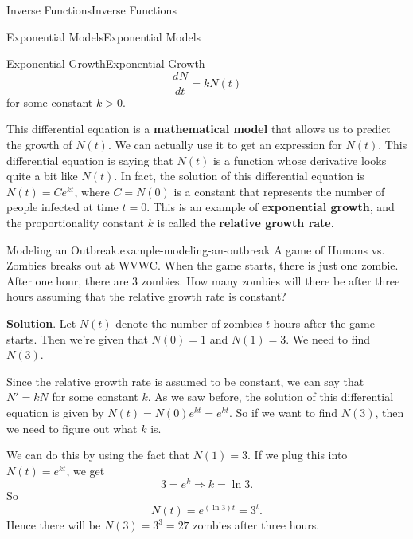 \documentclass[10pt,]{book}
\newcommand{\terminology}[1]{\textbf{#1}}
\numberwithin{equation}{section}
\newcommand{\dv}[3][]{\dfrac{d^{#1} #2}{d #3^{#1}}}
\begin{document}
\begin{chapterptx}{Inverse Functions}{}{Inverse Functions}{}{}
\begin{sectionptx}{Exponential Models}{}{Exponential Models}{}{}
\begin{subsectionptx}{Exponential Growth}{}{Exponential Growth}{}{}
\begin{equation*}
\dv{N}{t} = kN(t)
\end{equation*}
for some constant \(k > 0\).%
\par
\hypertarget{p-247}{}%
This differential equation is a \terminology{mathematical model} that allows us to predict the growth of \(N(t)\). We can actually use it to get an expression for \(N(t)\). This differential equation is saying that \(N(t)\) is a function whose derivative looks quite a bit like \(N(t)\). In fact, the solution of this differential equation is \(N(t) = Ce^{kt}\), where \(C = N(0)\) is a constant that represents the number of people infected at time \(t=0\). This is an example of \terminology{exponential growth}, and the proportionality constant \(k\) is called the \terminology{relative growth rate}.%
\begin{example}{Modeling an Outbreak.}{example-modeling-an-outbreak}%
\hypertarget{p-248}{}%
A game of Humans vs. Zombies breaks out at WVWC. When the game starts, there is just one zombie. After one hour, there are \(3\) zombies. How many zombies will there be after three hours assuming that the relative growth rate is constant?%
\par\smallskip%
\noindent\textbf{Solution}.\hypertarget{solution-54}{}\quad%
\hypertarget{p-249}{}%
Let \(N(t)\) denote the number of zombies \(t\) hours after the game starts. Then we're given that \(N(0) = 1\) and \(N(1) = 3\). We need to find \(N(3)\).%
\par
\hypertarget{p-250}{}%
Since the relative growth rate is assumed to be constant, we can say that \(N' = kN\) for some constant \(k\). As we saw before, the solution of this differential equation is given by \(N(t) = N(0)e^{kt} = e^{kt}\). So if we want to find \(N(3)\), then we need to figure out what \(k\) is.%
\par
\hypertarget{p-251}{}%
We can do this by using the fact that \(N(1) = 3\). If we plug this into \(N(t) = e^{kt}\), we get%
\begin{equation*}
3 = e^{k} \Rightarrow k = \ln3.
\end{equation*}
So%
\begin{equation*}
N(t) = e^{(\ln 3)t} = 3^{t}.
\end{equation*}
Hence there will be \(N(3) = 3^{3} = 27\) zombies after three hours.%
\end{example}
\end{subsectionptx}
%
%
\typeout{************************************************}

\end{sectionptx}
\end{chapterptx}
\end{document}
